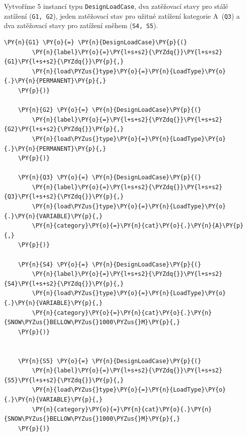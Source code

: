 Vytvoříme 5 instancí typu \texttt{DesignLoadCase}, dva zatěžovací stavy pro stálé zatížení (\texttt{G1, G2}), jeden zatěžovací stav pro užitné zatížení kategorie A~(\texttt{Q3}) a dva zatěžovací stavy pro zatížení sněhem (\texttt{S4, S5}).
        \begin{tcolorbox}[breakable, size=fbox, boxrule=1pt, pad at break*=1mm,colback=cellbackground, colframe=cellborder]
    \begin{Verbatim}[commandchars=\\\{\}]
    \PY{n}{G1} \PY{o}{=} \PY{n}{DesignLoadCase}\PY{p}{(}
        \PY{n}{label}\PY{o}{=}\PY{l+s+s2}{\PYZdq{}}\PY{l+s+s2}{G1}\PY{l+s+s2}{\PYZdq{}}\PY{p}{,}
        \PY{n}{load\PYZus{}type}\PY{o}{=}\PY{n}{LoadType}\PY{o}{.}\PY{n}{PERMANENT}\PY{p}{,}
    \PY{p}{)}
    
    \PY{n}{G2} \PY{o}{=} \PY{n}{DesignLoadCase}\PY{p}{(}
        \PY{n}{label}\PY{o}{=}\PY{l+s+s2}{\PYZdq{}}\PY{l+s+s2}{G2}\PY{l+s+s2}{\PYZdq{}}\PY{p}{,}
        \PY{n}{load\PYZus{}type}\PY{o}{=}\PY{n}{LoadType}\PY{o}{.}\PY{n}{PERMANENT}\PY{p}{,}
    \PY{p}{)}
    
    \PY{n}{Q3} \PY{o}{=} \PY{n}{DesignLoadCase}\PY{p}{(}
        \PY{n}{label}\PY{o}{=}\PY{l+s+s2}{\PYZdq{}}\PY{l+s+s2}{Q3}\PY{l+s+s2}{\PYZdq{}}\PY{p}{,}
        \PY{n}{load\PYZus{}type}\PY{o}{=}\PY{n}{LoadType}\PY{o}{.}\PY{n}{VARIABLE}\PY{p}{,}
        \PY{n}{category}\PY{o}{=}\PY{n}{cat}\PY{o}{.}\PY{n}{A}\PY{p}{,}
    \PY{p}{)}
    
    \PY{n}{S4} \PY{o}{=} \PY{n}{DesignLoadCase}\PY{p}{(}
        \PY{n}{label}\PY{o}{=}\PY{l+s+s2}{\PYZdq{}}\PY{l+s+s2}{S4}\PY{l+s+s2}{\PYZdq{}}\PY{p}{,}
        \PY{n}{load\PYZus{}type}\PY{o}{=}\PY{n}{LoadType}\PY{o}{.}\PY{n}{VARIABLE}\PY{p}{,}
        \PY{n}{category}\PY{o}{=}\PY{n}{cat}\PY{o}{.}\PY{n}{SNOW\PYZus{}BELLOW\PYZus{}1000\PYZus{}M}\PY{p}{,}
    \PY{p}{)}
    
    
    \PY{n}{S5} \PY{o}{=} \PY{n}{DesignLoadCase}\PY{p}{(}
        \PY{n}{label}\PY{o}{=}\PY{l+s+s2}{\PYZdq{}}\PY{l+s+s2}{S5}\PY{l+s+s2}{\PYZdq{}}\PY{p}{,}
        \PY{n}{load\PYZus{}type}\PY{o}{=}\PY{n}{LoadType}\PY{o}{.}\PY{n}{VARIABLE}\PY{p}{,}
        \PY{n}{category}\PY{o}{=}\PY{n}{cat}\PY{o}{.}\PY{n}{SNOW\PYZus{}BELLOW\PYZus{}1000\PYZus{}M}\PY{p}{,}
    \PY{p}{)}
    \end{Verbatim}
    \end{tcolorbox}

